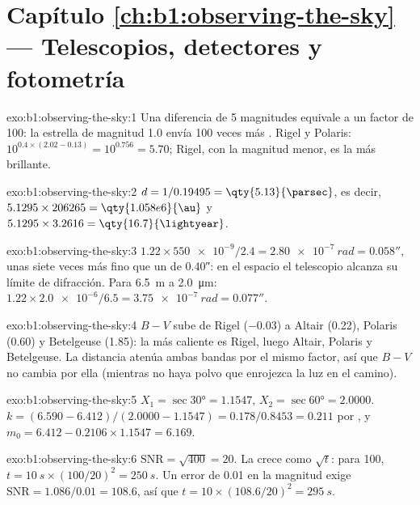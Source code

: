 \section*{Capítulo \ref{ch:b1:observing-the-sky} --- Telescopios, detectores y fotometría}

\begin{solution}{exo:b1:observing-the-sky:1}
Una diferencia de 5 magnitudes equivale a un factor de 100: la estrella de magnitud 1.0
envía 100 veces más . Rigel y Polaris: $10^{0.4\times(2.02 - 0.13)} =
10^{0.756} = 5.70$; Rigel, con la magnitud menor, es la más brillante.
\end{solution}

\begin{solution}{exo:b1:observing-the-sky:2}
$d = 1/0.19495 = \qty{5.13}{\parsec}$, es decir, $5.1295\times206265 =
\qty{1.058e6}{\au}$ y $5.1295\times3.2616 = \qty{16.7}{\lightyear}$.
\end{solution}

\begin{solution}{exo:b1:observing-the-sky:3}
$1.22\times\num{550e-9}/2.4 = \qty{2.80e-7}{rad} = \ang{;;0.058}$, unas siete veces más
fino que un  de \ang{;;0.40}: en el espacio el telescopio alcanza su límite de
difracción. Para \qty{6.5}{m} a \qty{2.0}{\micro\metre}:
$1.22\times\num{2.0e-6}/6.5 = \qty{3.75e-7}{rad} = \ang{;;0.077}$.
\end{solution}

\begin{solution}{exo:b1:observing-the-sky:4}
$B - V$ sube de Rigel ($-0.03$) a Altair (0.22), Polaris (0.60) y Betelgeuse (1.85): la
más caliente es Rigel, luego Altair, Polaris y Betelgeuse. La distancia atenúa ambas bandas
por el mismo factor, así que $B - V$ no cambia por ella (mientras no haya polvo que enrojezca
la luz en el camino).
\end{solution}

\begin{solution}{exo:b1:observing-the-sky:5}
$X_1 = \sec\ang{30} = 1.1547$, $X_2 = \sec\ang{60} = 2.0000$.
$k = (6.590 - 6.412)/(2.0000 - 1.1547) = 0.178/0.8453 = \num{0.211}$ por , y
$m_0 = 6.412 - 0.2106\times1.1547 = 6.169$.
\end{solution}

\begin{solution}{exo:b1:observing-the-sky:6}
$\mathrm{SNR} = \sqrt{400} = 20$. La  crece como $\sqrt t$: para 100,
$t = \qty{10}{s}\times(100/20)^2 = \qty{250}{s}$. Un error de \num{0.01} en la magnitud
exige $\mathrm{SNR} = 1.086/0.01 = 108.6$, así que
$t = 10\times(108.6/20)^2 = \qty{295}{s}$.
\end{solution}


